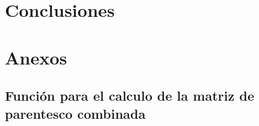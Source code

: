 \documentclass[11pt,spanish,a4paper,oneside,]{book} %
\begin{document}
\hypertarget{conclusiones}{%
\chapter{Conclusiones}\label{conclusiones}}

\hypertarget{appendix-appendix}{%
\appendix}


\hypertarget{anexos}{%
\chapter{Anexos}\label{anexos}}

\hypertarget{funciuxf3n-para-el-calculo-de-la-matriz-de-parentesco-combinada}{%
\section{Función para el calculo de la matriz de parentesco combinada}\label{funciuxf3n-para-el-calculo-de-la-matriz-de-parentesco-combinada}}
\end{document}
